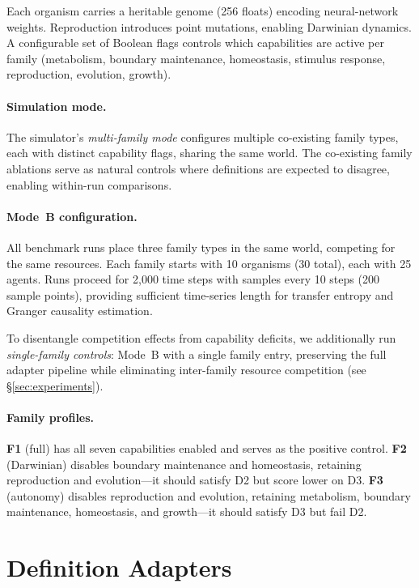 \documentclass[letterpaper]{article}
\begin{document}
Each organism carries a heritable genome (256 floats) encoding neural-network
weights.  Reproduction introduces point mutations, enabling Darwinian
dynamics.  A configurable set of Boolean flags controls which capabilities
are active per family (metabolism, boundary maintenance, homeostasis,
stimulus response, reproduction, evolution, growth).

\paragraph{Simulation mode.}
The simulator's \emph{multi-family mode} configures multiple co-existing
family types, each with distinct capability flags, sharing the same world.
The co-existing family ablations serve as natural controls where definitions
are expected to disagree, enabling within-run comparisons.

\paragraph{Mode~B configuration.}
All benchmark runs place three family types in the same
world, competing for the same resources.  Each family starts with 10
organisms (30 total), each with 25 agents.  Runs proceed for 2{,}000
time steps with samples every 10 steps (200 sample points), providing
sufficient time-series length for transfer entropy and Granger causality
estimation.

To disentangle competition effects from capability deficits, we additionally
run \emph{single-family controls}: Mode~B with a single family entry,
preserving the full adapter pipeline while eliminating inter-family
resource competition (see \S\ref{sec:experiments}).

\paragraph{Family profiles.}
\textbf{F1} (full) has all seven capabilities enabled and serves as the
positive control.  \textbf{F2} (Darwinian) disables boundary maintenance
and homeostasis, retaining reproduction and evolution---it should satisfy
D2 but score lower on D3.  \textbf{F3} (autonomy) disables reproduction
and evolution, retaining metabolism, boundary maintenance, homeostasis,
and growth---it should satisfy D3 but fail D2.

\section{Definition Adapters}
\label{sec:adapters}
\end{document}
